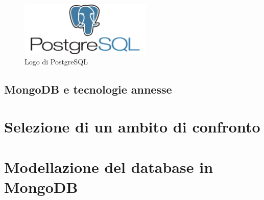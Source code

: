 \begin{figure}[htbp]
\begin{center}
\includegraphics[height=7em]{immagini/tecnologies-logos/postgresql-logo.png}
\caption{Logo di PostgreSQL}
\end{center}
\end{figure}

\subsection{MongoDB e tecnologie annesse}

\section{Selezione di un ambito di confronto}

\section{Modellazione del database in MongoDB}